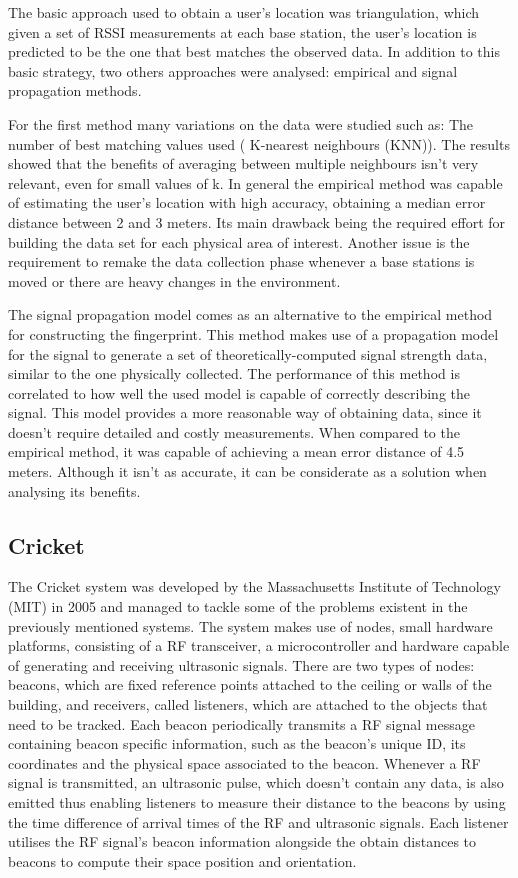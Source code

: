   
The basic approach used to obtain a user's location was triangulation, which given a set of \ac{RSSI} measurements at each base station, the user's location is predicted to be the one that best matches the observed data. In addition to this basic strategy, two others approaches were analysed: empirical and signal propagation methods.   
  
  
For the first method many variations on the data were studied such as: The number of best matching values used ( K-nearest neighbours (KNN)). The results showed that the benefits of averaging between multiple neighbours isn't very relevant, even for small values of k. In general the empirical method was capable of estimating the user's location with high accuracy, obtaining a median error distance between 2 and 3 meters. Its main drawback being the required effort for building the data set for each physical area of interest. Another issue is the requirement to remake the data collection phase whenever a base stations is moved or there are heavy changes in the environment.  
  
  
The signal propagation model comes as an alternative to the empirical method for constructing the fingerprint. This method makes use of a propagation model for the signal to generate a set of theoretically-computed signal strength data, similar to the one physically collected. The performance of this method is correlated to how well the used model is capable of correctly describing the signal. This model provides a more reasonable way of obtaining data, since it doesn't require detailed and costly measurements. When compared to the empirical method, it was capable of achieving a mean error distance of 4.5 meters. Although it isn't as accurate, it can be considerate as a solution when analysing its benefits.  
  
  
\subsection{Cricket}  
\label{subsec:cricket}  
  
  
The Cricket system\cite{cricket} was developed by the Massachusetts Institute of Technology (MIT) in 2005 and managed to tackle some of the problems existent in the previously mentioned systems. The system makes use of nodes, small hardware platforms, consisting of a RF transceiver, a microcontroller and hardware capable of generating and receiving ultrasonic signals. There are two types of nodes: beacons, which are fixed reference points attached to the ceiling or walls of the building, and receivers, called listeners, which are attached to the objects that need to be tracked. Each beacon periodically transmits a \ac{RF} signal message containing beacon specific information, such as the beacon's unique ID, its coordinates and the physical space associated to the beacon. Whenever a \ac{RF} signal is transmitted, an ultrasonic pulse, which doesn't contain any data, is also emitted thus enabling listeners to measure their distance to the beacons by using the time difference of arrival times of the RF and ultrasonic signals. Each listener utilises the RF signal's beacon information alongside the obtain distances to beacons to compute their space position and orientation.   
  
